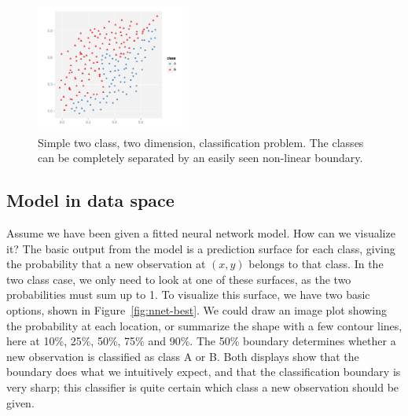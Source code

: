 \documentclass[preprint]{imsart}
\begin{document}
\begin{figure}[htbp]
  \centering
    \includegraphics[width=0.45\textwidth]{nnet-test}
  \caption{Simple two class, two dimension, classification problem.  The classes can be completely separated by an easily seen non-linear boundary.}
  \label{fig:nnet-test}
\end{figure}

\subsection{Model in data space}
\label{sub:minds}

Assume we have been given a fitted neural network model.  How can we visualize it?  The basic output from the model is a prediction surface for each class, giving the probability that a new observation at $(x, y)$ belongs to that class.  In the two class case, we only need to look at one of these surfaces, as the two probabilities must sum up to 1.  To visualize this surface, we have two basic options, shown in Figure~\ref{fig:nnet-best}. We could draw an image plot showing the probability at each location, or summarize the shape with a few contour lines, here at 10\%, 25\%, 50\%, 75\% and 90\%.  The 50\% boundary determines whether a new observation is classified as class A or B.  Both displays show that the boundary does what we intuitively expect, and that the classification boundary is very sharp; this classifier is quite certain which class a new observation should be given.
\end{document}
